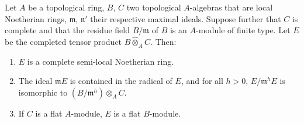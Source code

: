 \begin{lemma}[19.7.1.2]
\label{0.19.7.1.2}
Let $A$ be a topological ring, $B$, $C$ two topological $A$-algebras that are local Noetherian rings, $\mathfrak{m}$, $\mathfrak{n}'$ their respective maximal ideals.
Suppose further that $C$ is complete and that the residue field $B/\mathfrak{m}$ of $B$ is an $A$-module of finite type.
Let $E$ be the completed tensor product $B\widehat{\otimes}_A C$.
Then:
\begin{enumerate}
  \item[\rm(i)] $E$ is a complete semi-local Noetherian ring.
  \item[\rm(ii)] The ideal $\mathfrak{m}E$ is contained in the radical of $E$, and for all $h>0$, $E/\mathfrak{m}^h E$ is isomorphic to $(B/\mathfrak{m}^h)\otimes_A C$.
  \item[\rm(iii)] If $C$ is a flat $A$-module, $E$ is a flat $B$-module.
\end{enumerate}
\end{lemma}

